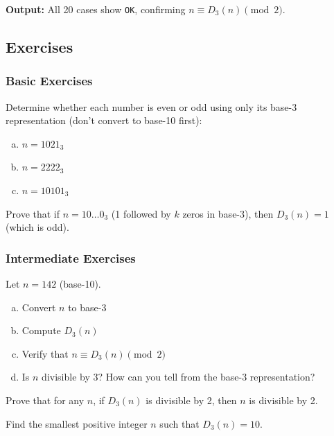 \textbf{Output:} All 20 cases show \texttt{OK}, confirming $n \equiv D_3(n) \pmod{2}$.

\subsection{Exercises}
\label{subsec:divisibility-exercises}

\subsubsection*{Basic Exercises}

\begin{exercise}
Determine whether each number is even or odd using only its base-3 representation (don't convert to base-10 first):
\begin{enumerate}[(a)]
\item $n = 1021_3$
\item $n = 2222_3$
\item $n = 10101_3$
\end{enumerate}
\end{exercise}

\begin{exercise}
Prove that if $n = 10\ldots0_3$ (1 followed by $k$ zeros in base-3), then $D_3(n) = 1$ (which is odd).
\end{exercise}

\subsubsection*{Intermediate Exercises}

\begin{exercise}
Let $n = 142$ (base-10).
\begin{enumerate}[(a)]
\item Convert $n$ to base-3
\item Compute $D_3(n)$
\item Verify that $n \equiv D_3(n) \pmod{2}$
\item Is $n$ divisible by 3? How can you tell from the base-3 representation?
\end{enumerate}
\end{exercise}

\begin{exercise}
Prove that for any $n$, if $D_3(n)$ is divisible by 2, then $n$ is divisible by 2.
\end{exercise}

\begin{exercise}
Find the smallest positive integer $n$ such that $D_3(n) = 10$.
\end{exercise}

